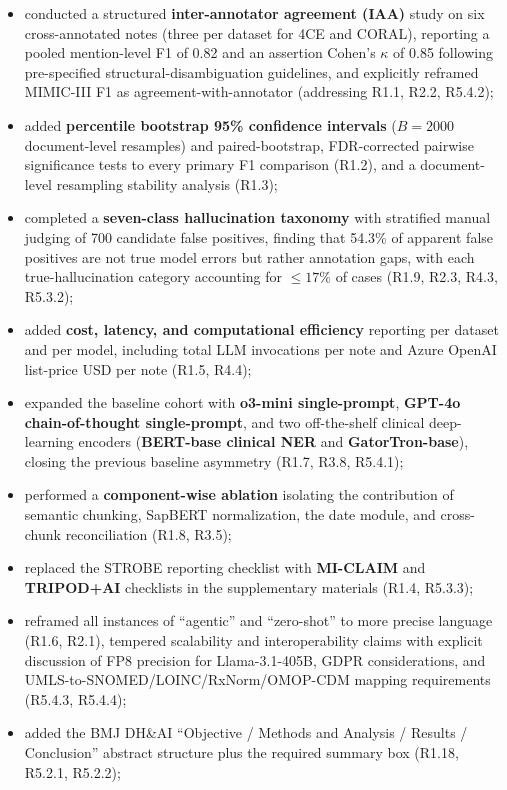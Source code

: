 \documentclass[11pt,letterpaper]{article}
\begin{document}
\begin{itemize}
    \item conducted a structured \textbf{inter-annotator agreement (IAA)} study on six cross-annotated notes (three per dataset for 4CE and CORAL), reporting a pooled mention-level F1 of 0.82 and an assertion Cohen's $\kappa$ of 0.85 following pre-specified structural-disambiguation guidelines, and explicitly reframed MIMIC-III F1 as agreement-with-annotator (addressing R1.1, R2.2, R5.4.2);
    \item added \textbf{percentile bootstrap 95\% confidence intervals} ($B=2000$ document-level resamples) and paired-bootstrap, FDR-corrected pairwise significance tests to every primary F1 comparison (R1.2), and a document-level resampling stability analysis (R1.3);
    \item completed a \textbf{seven-class hallucination taxonomy} with stratified manual judging of 700 candidate false positives, finding that 54.3\% of apparent false positives are not true model errors but rather annotation gaps, with each true-hallucination category accounting for $\leq 17\%$ of cases (R1.9, R2.3, R4.3, R5.3.2);
    \item added \textbf{cost, latency, and computational efficiency} reporting per dataset and per model, including total LLM invocations per note and Azure OpenAI list-price USD per note (R1.5, R4.4);
    \item expanded the baseline cohort with \textbf{o3-mini single-prompt}, \textbf{GPT-4o chain-of-thought single-prompt}, and two off-the-shelf clinical deep-learning encoders (\textbf{BERT-base clinical NER} and \textbf{GatorTron-base}), closing the previous baseline asymmetry (R1.7, R3.8, R5.4.1);
    \item performed a \textbf{component-wise ablation} isolating the contribution of semantic chunking, SapBERT normalization, the date module, and cross-chunk reconciliation (R1.8, R3.5);
    \item replaced the STROBE reporting checklist with \textbf{MI-CLAIM} and \textbf{TRIPOD+AI} checklists in the supplementary materials (R1.4, R5.3.3);
    \item reframed all instances of ``agentic'' and ``zero-shot'' to more precise language (R1.6, R2.1), tempered scalability and interoperability claims with explicit discussion of FP8 precision for Llama-3.1-405B, GDPR considerations, and UMLS-to-SNOMED/LOINC/RxNorm/OMOP-CDM mapping requirements (R5.4.3, R5.4.4);
    \item added the BMJ DH\&AI ``Objective / Methods and Analysis / Results / Conclusion'' abstract structure plus the required summary box (R1.18, R5.2.1, R5.2.2);

\end{itemize}
\end{document}
